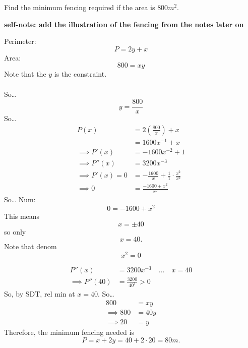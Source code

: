 \documentclass{article}
\begin{document}
\begin{examplebox}
    Find the minimum fencing required if the area is \( 800 m^2 \).

    \begin{illustrationbox}
        \textbf{self-note: add the illustration of the fencing from the notes later on}
    \end{illustrationbox}

    \begin{solutionbox}
        Perimeter:
        \[
            P = 2y + x
        \]
        Area:
        \[
            800 = xy
        \]
        Note that the \( y \) is the constraint. \\
        \\
        So\dots
        \[
            y = \frac{800}{x}
        \]
        So\dots
        \begin{align*}
            P(x) &= 2  (\frac{800}{x}) + x \\
            &= 1600x^{-1} + x \\
            \implies P'(x) &= -1600x^{-2} + 1 \\
            \implies P''(x) &= 3200x^{-3} \\
            \implies P'(x) = 0 &= -\frac{1600}{x} + \frac{1}{1} \cdot \frac{x^2}{x^2} \\
            \implies 0 &= \frac{-1600 + x^2}{x^2}
        \end{align*}
        So\dots
        Num:
        \[
            0 = -1600 + x^2
        \]
        This means
        \[
            x = \pm 40
        \]
        so only
        \[
            x = 40.
        \]
        Note that denom
        \[
            x^2 = 0
        \]

        \begin{align*}
            P''(x) &= 3200x^{-3} \quad \dots \quad x = 40 \\
            \implies P''(40) &= \frac{3200}{40^3} > 0
        \end{align*}
        So, by SDT, rel min at \( x = 40 \).
        So\dots
        \begin{align*}
            800 &= xy \\
            \implies 800 &= 40y \\
            \implies 20 &= y
        \end{align*}
        Therefore, the minimum fencing needed is
        \[
            P = x + 2y = 40 + 2 \cdot 20 = 80 m.
        \]
    \end{solutionbox}
\end{examplebox}
\end{document}
